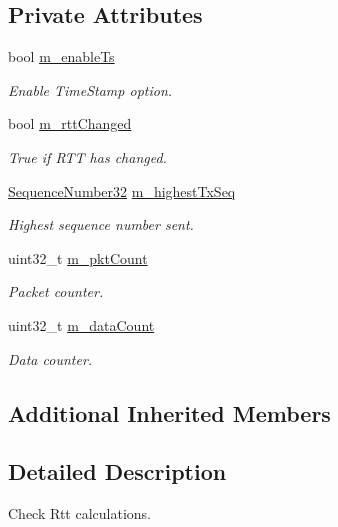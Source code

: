 \subsection*{Private Attributes}
\begin{DoxyCompactItemize}
\item 
bool \hyperlink{classTcpRttEstimationTest_a38fddc898bc183558475f0eff7f6ae1a}{m\+\_\+enable\+Ts}
\begin{DoxyCompactList}\small\item\em Enable Time\+Stamp option. \end{DoxyCompactList}\item 
bool \hyperlink{classTcpRttEstimationTest_a5282ebae2ff937ed719a965467637fcd}{m\+\_\+rtt\+Changed}
\begin{DoxyCompactList}\small\item\em True if R\+TT has changed. \end{DoxyCompactList}\item 
\hyperlink{group__network_gacb2070e4e98d2d5135c9bede58f07a03}{Sequence\+Number32} \hyperlink{classTcpRttEstimationTest_a3c08a5a07c9dc4c9c85c6d8fe4f7ca68}{m\+\_\+highest\+Tx\+Seq}
\begin{DoxyCompactList}\small\item\em Highest sequence number sent. \end{DoxyCompactList}\item 
uint32\+\_\+t \hyperlink{classTcpRttEstimationTest_a4d52bd083094492d32dd4d57e77779ca}{m\+\_\+pkt\+Count}
\begin{DoxyCompactList}\small\item\em Packet counter. \end{DoxyCompactList}\item 
uint32\+\_\+t \hyperlink{classTcpRttEstimationTest_afc3c949430c9dddc0c6d761d3d8ebf30}{m\+\_\+data\+Count}
\begin{DoxyCompactList}\small\item\em Data counter. \end{DoxyCompactList}\end{DoxyCompactItemize}
\subsection*{Additional Inherited Members}


\subsection{Detailed Description}
Check Rtt calculations. 

